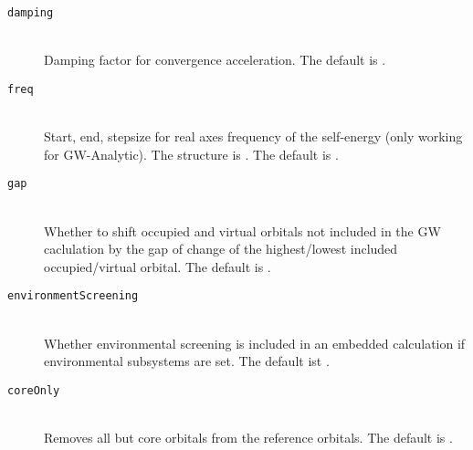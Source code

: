 \begin{description}
  \item [\texttt{damping}]\hfill \\
  Damping factor for convergence acceleration. The default is .
  \item [\texttt{freq}]\hfill \\
  Start, end, stepsize for real axes frequency of the self-energy (only working for GW-Analytic). The structure is . The default is \ttt{$\{\}$}.
  \item [\texttt{gap}]\hfill \\
  Whether to shift occupied and virtual orbitals not included in the GW caclulation by the gap of change of the highest/lowest included occupied/virtual orbital. The default is .
  \item [\texttt{environmentScreening}]\hfill \\
  Whether environmental screening is included in an embedded calculation if environmental subsystems are set. The default ist .
  \item [\texttt{coreOnly}]\hfill \\
  Removes all but core orbitals from the reference orbitals. The default is .
\end{description}
